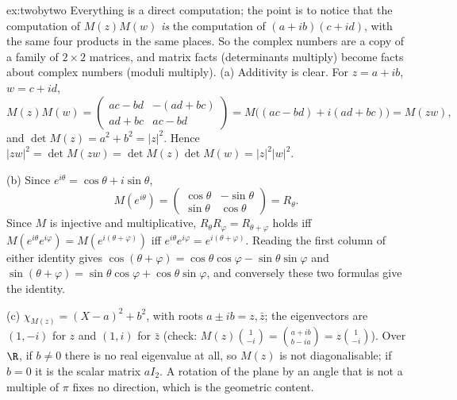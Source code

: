 \begin{solution}{ex:twobytwo}
\idea Everything is a direct computation; the point is to notice that the computation of $M(z)M(w)$ \emph{is} the computation of $(a+ib)(c+id)$, with the same four products in the same places. So the complex numbers are a copy of a family of $2\times2$ matrices, and matrix facts (determinants multiply) become facts about complex numbers (moduli multiply).
\writeup (a) Additivity is clear. For $z=a+ib$, $w=c+id$,
\[
M(z)M(w)=\begin{pmatrix}ac-bd&-(ad+bc)\\ad+bc&ac-bd\end{pmatrix}=M\big((ac-bd)+i(ad+bc)\big)=M(zw),
\]
and $\det M(z)=a^2+b^2=|z|^2$. Hence $|zw|^2=\det M(zw)=\det M(z)\det M(w)=|z|^2|w|^2$.

(b) Since $e^{i\theta}=\cos\theta+i\sin\theta$,
\[
M(e^{i\theta})=\begin{pmatrix}\cos\theta&-\sin\theta\\\sin\theta&\cos\theta\end{pmatrix}=R_\theta.
\] Since $M$ is injective and multiplicative, $R_\theta R_\varphi=R_{\theta+\varphi}$ holds iff $M(e^{i\theta}e^{i\varphi})=M(e^{i(\theta+\varphi)})$ iff $e^{i\theta}e^{i\varphi}=e^{i(\theta+\varphi)}$. Reading the first column of either identity gives $\cos(\theta+\varphi)=\cos\theta\cos\varphi-\sin\theta\sin\varphi$ and $\sin(\theta+\varphi)=\sin\theta\cos\varphi+\cos\theta\sin\varphi$, and conversely these two formulas give the identity.

(c) $\chi_{M(z)}=(X-a)^2+b^2$, with roots $a\pm ib=z,\bar z$; the eigenvectors are $(1,-i)$ for $z$ and $(1,i)$ for $\bar z$ (check: $M(z)\binom1{-i}=\binom{a+ib}{b-ia}=z\binom1{-i}$). Over $\R$, if $b\ne0$ there is no real eigenvalue at all, so $M(z)$ is not diagonalisable; if $b=0$ it is the scalar matrix $aI_2$. A rotation of the plane by an angle that is not a multiple of $\pi$ fixes no direction, which is the geometric content.
\end{solution}

